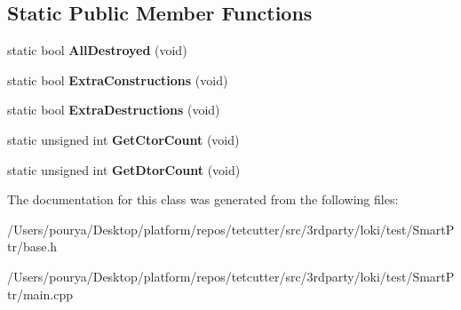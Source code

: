 \subsection*{Static Public Member Functions}
\begin{DoxyCompactItemize}
\item 
\hypertarget{classBaseClass_a76582edb90430008c23bc538672781a4}{}static bool {\bfseries All\+Destroyed} (void)\label{classBaseClass_a76582edb90430008c23bc538672781a4}

\item 
\hypertarget{classBaseClass_a953a42efff1ef3b79cd198f826eada0b}{}static bool {\bfseries Extra\+Constructions} (void)\label{classBaseClass_a953a42efff1ef3b79cd198f826eada0b}

\item 
\hypertarget{classBaseClass_aa24645e676f2d67e9ab3a3663ea1cd96}{}static bool {\bfseries Extra\+Destructions} (void)\label{classBaseClass_aa24645e676f2d67e9ab3a3663ea1cd96}

\item 
\hypertarget{classBaseClass_a1ef2464f1163623236504f83278585c4}{}static unsigned int {\bfseries Get\+Ctor\+Count} (void)\label{classBaseClass_a1ef2464f1163623236504f83278585c4}

\item 
\hypertarget{classBaseClass_ab320bed94ee47d17f744e3bd07468550}{}static unsigned int {\bfseries Get\+Dtor\+Count} (void)\label{classBaseClass_ab320bed94ee47d17f744e3bd07468550}

\end{DoxyCompactItemize}


The documentation for this class was generated from the following files\+:\begin{DoxyCompactItemize}
\item 
/\+Users/pourya/\+Desktop/platform/repos/tetcutter/src/3rdparty/loki/test/\+Smart\+Ptr/base.\+h\item 
/\+Users/pourya/\+Desktop/platform/repos/tetcutter/src/3rdparty/loki/test/\+Smart\+Ptr/main.\+cpp\end{DoxyCompactItemize}
